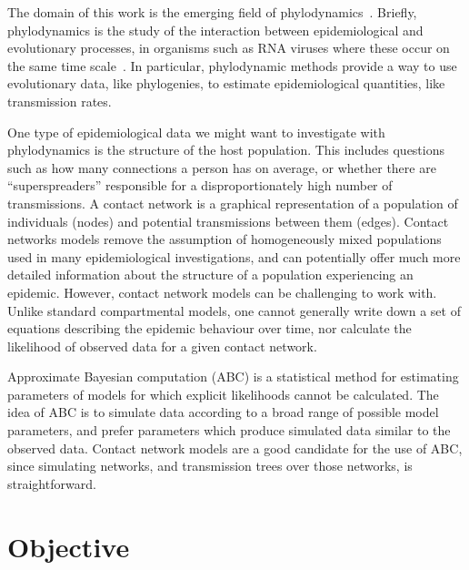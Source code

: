 \documentclass{article}
\begin{document}
The domain of this work is the emerging field of
phylodynamics~\autocite{grenfell2004unifying}. Briefly, phylodynamics is the
study of the interaction between epidemiological and evolutionary processes, in
organisms such as RNA viruses where these occur on the same time
scale~\autocite{drummond2003measurably}. In particular, phylodynamic methods
provide a way to use evolutionary data, like phylogenies, to estimate
epidemiological quantities, like transmission rates.

One type of epidemiological data we might want to investigate with
phylodynamics is the structure of the host population. This includes questions
such as how many connections a person has on average, or whether there are
``superspreaders'' responsible for a disproportionately high number of
transmissions. A contact network is a graphical representation of a population
of individuals (nodes) and potential transmissions between them (edges).
Contact networks models remove the assumption of homogeneously mixed
populations used in many epidemiological investigations, and can potentially
offer much more detailed information about the structure of a population
experiencing an epidemic. However, contact network models can be challenging to
work with. Unlike standard compartmental models, one cannot generally write
down a set of equations describing the epidemic behaviour over time, nor
calculate the likelihood of observed data for a given contact network.

Approximate Bayesian computation (ABC) is a statistical method for estimating
parameters of models for which explicit likelihoods cannot be calculated. The
idea of ABC is to simulate data according to a broad range of possible model
parameters, and prefer parameters which produce simulated data similar to the
observed data. Contact network models are a good candidate for the use of ABC,
since simulating networks, and transmission trees over those networks, is
straightforward.

\section{Objective}
\end{document}

